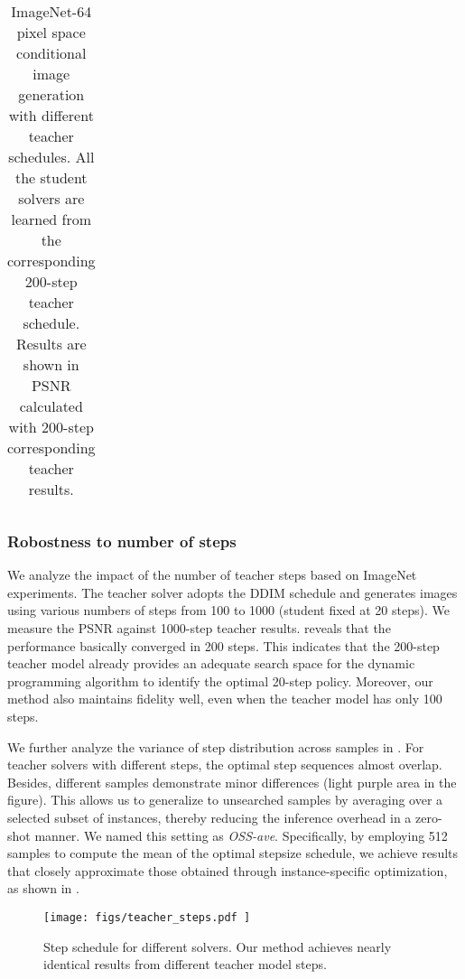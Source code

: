 \documentclass[10pt,twocolumn,letterpaper]{article}
\begin{document}
\begin{table}[h]
\begin{tabular}{cc|ccc}
\bottomrule
\end{tabular}
\vspace{-0.3cm}
        \caption{ImageNet-64 pixel space conditional image generation with different teacher schedules. All the student solvers are learned from the corresponding 200-step teacher schedule. Results are shown in PSNR calculated with 200-step corresponding teacher results.}
        \label{table:pixel_teacherschedule}
        \vspace{-0.1cm}
\end{table}


    \subsubsection{Robostness to number of steps} \label{sec:teacher_steps}
    We analyze the impact of the number of teacher steps based on ImageNet experiments. The teacher solver adopts the DDIM schedule and generates images using various numbers of steps from 100 to 1000 (student fixed at 20 steps). We measure the PSNR against 1000-step teacher results.  reveals that the performance basically converged in 200 steps. This indicates that the 200-step teacher model already provides an adequate search space for the dynamic programming algorithm to identify the optimal 20-step policy. Moreover, our method also maintains fidelity well, even when the teacher model has only 100 steps.

    We further analyze the variance of step distribution across samples in . For teacher solvers with different steps, the optimal step sequences almost overlap. Besides, different samples demonstrate minor differences (light purple area in the figure). This allows us to generalize to unsearched samples by averaging over a selected subset of instances, thereby reducing the inference overhead in a zero-shot manner. We named this setting as \emph{OSS-ave}. Specifically, by employing 512 samples to compute the mean of the optimal stepsize schedule, we achieve results that closely approximate those obtained through instance-specific optimization, as shown in . 


    \begin{figure}[t]
        \centering
        \texttt{[image: 
            figs/teacher\_steps.pdf
        ]}
        \caption{Step schedule for different solvers. Our method achieves nearly identical results from different teacher model steps.}
        \label{fig:step_variance}
    \end{figure}
\end{document}
